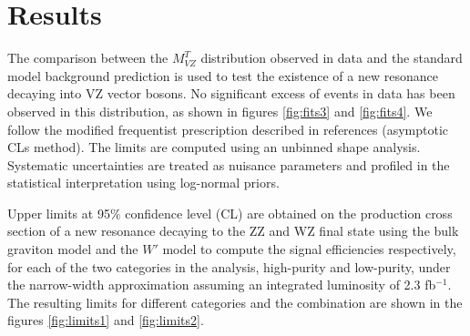 \chapter{Results}\label{results}

The comparison between the $M_{VZ}^{T}$ distribution observed in data and the standard model
background prediction is used to test the existence of a new resonance decaying into VZ vector bosons.
No significant excess of events in data has been observed in this distribution, as shown in figures \ref{fig:fits3} and \ref{fig:fits4}.
We follow the modified frequentist prescription described in references \cite{CLs1,Junk:1999kv}(asymptotic CLs method). The limits are computed using an unbinned shape analysis. Systematic uncertainties are treated as nuisance parameters and profiled in the statistical interpretation using log-normal priors.

Upper limits at 95$\%$ confidence level (CL) are obtained
on the production cross section of a new resonance decaying to the
ZZ and WZ final state using the bulk graviton model and the $W'$ model to compute the signal efficiencies respectively, for each of the two categories in the analysis, high-purity and low-purity, under the narrow-width approximation assuming an integrated luminosity of 2.3 fb$^{-1}$. The resulting limits for different categories and the combination are shown in the figures \ref{fig:limits1} and \ref{fig:limits2}.


